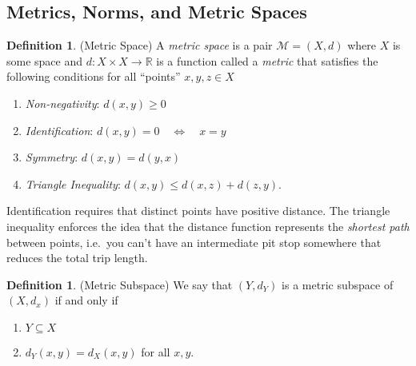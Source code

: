 \documentclass[12pt]{article}
\numberwithin{equation}{section} %
\theoremstyle{plain}
\theoremstyle{definition}
\newtheorem{defn}[thm]{Definition}
\theoremstyle{remark}
\newcommand{\R}{\mathbb{R}}
\begin{document}
\subsection{Metrics, Norms, and Metric Spaces}

\begin{defn}{(Metric Space)}
\label{defn:metric}
A \emph{metric space} is a pair $\mathscr{M}=(X,d)$ where $X$ is some
space and $d:X\times X\rightarrow \R$ is a function
called a \emph{metric} that satisfies the following conditions for all
``points'' $x,y,z\in X$
\begin{enumerate}
  \item \emph{Non-negativity}: $d(x,y)\geq 0$
  \item \emph{Identification}: $d(x,y) = 0 \quad \Leftrightarrow \quad x=y$
  \item \emph{Symmetry}: $d(x,y)=d(y,x)$
  \item \emph{Triangle Inequality}: $d(x,y) \leq d(x,z) + d(z,y)$.
\end{enumerate}
Identification requires that distinct points have positive distance.
The triangle inequality enforces the idea that the distance function
represents the \emph{shortest path} between points, i.e.\ you can't have
an intermediate pit stop somewhere that reduces the total trip length.
\end{defn}
\begin{defn}{(Metric Subspace)}
We say that $(Y,d_Y)$ is a metric subspace of $(X,d_x)$ if and only if
\begin{enumerate}
  \item $Y\subseteq X$
  \item $d_Y(x,y) = d_X(x,y)$ for all $x,y$.
\end{enumerate}
\end{defn}
\end{document}
